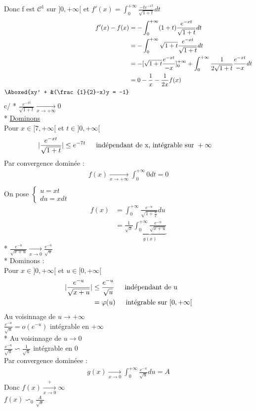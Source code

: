 \documentclass{article}
\begin{document}
Donc f est \(\mathcal{C}^{1}\) sur \(]0, +\infty[\) et \(f'(x) = \int_{0}^{+\infty}\frac{-te^{-x t}}{\sqrt{1+t}}dt\)
\begin{align*}
  f'(x)-f(x) &= -\int_{0}^{+\infty}(1+t)\frac{e^{-x t}}{\sqrt{1+t}}dt\\
             &= -\int_{0}^{+\infty}\sqrt{1+t}\frac{e^{-x t}}{\sqrt{1+t}}dt \\
             &= -[\sqrt{1+t}\frac{e^{-xt}}{-x}]^{+\infty}_{0} + \int_{0}^{+\infty}\frac{1}{2 \sqrt{1+t}}\frac{e^{-x t}}{-x}dt\\
             &= 0 - \frac{1}{x} - \frac{1}{2x}f(x)\\
  \Aboxed{xy' + &(\frac{1}{2}-x)y = -1}
\end{align*}
c/ * \(\frac{e^{-x t}}{\sqrt{1+t}}\xrightarrow[x \to +\infty]{} 0\)\\ 
* \underline{Dominons}\\ 
Pour \(x \in [7, +\infty[\) et \(t \in ]0, +\infty[\)\\ 
\begin{align*}
  |\frac{e^{-x t}}{\sqrt{1+t}}| &\leq e^{-7 t} \indent \text{indépendant de x, intégrable sur } +\infty
\end{align*}
Par convergence dominée : 
\begin{align*}
  f(x) \xrightarrow[x\to +\infty]{} \int_{0}^{+\infty}0 dt = 0 \\ 
\end{align*}
On pose 
\(\begin{cases}
    u = xt \\
    du =  x dt 
\end{cases}\)
\begin{align*}
  f(x) &= \int_{0}^{+\infty}\frac{e^{-u}}{\sqrt{1 + \frac{u}{x}}}du \\ 
       &= \frac{1}{\sqrt{x}}\underbrace{\int_{0}^{+\infty}\frac{e^{-u }}{\sqrt{x + u}}}_{g(x)}
\end{align*}
* \(\frac{e^{-u }}{\sqrt{x + u}} \xrightarrow[x \to 0]{} \frac{e^{-u }}{\sqrt{u }}\)\\ 
* Dominons : \\
Pour \(x \in ]0, +\infty[\) et \(u \in [0, +\infty[\)
\begin{align*}
  |\frac{e^{-u }}{\sqrt{x + u }}| &\leq \frac{e^{-u }}{\sqrt{u }} \indent \text{indépendant de u}\\ 
                                  &= \varphi(u) \indent \text{intégrable sur } [0, +\infty[
\end{align*}
Au voisinnage de \(u \rightarrow +\infty\)\\
\(\frac{e^{-u }}{\sqrt{u }} = o(e^{-u})\) intégrable en \(+\infty\)\\ 
* Au voisinnage de \(u \to 0\)\\
\(\frac{e^{-u }}{\sqrt{u }} \backsim \frac{1}{\sqrt{u }}\) intégrable en 0\\
Par convergence dominéee : 
\begin{align*}
  g(x) \xrightarrow[x \to 0]{}\int_{0}^{+\infty}\frac{e^{-u }}{\sqrt{u }}du = A 
\end{align*}
Donc \(f(x) \xrightarrow[x \to 0] +\infty\)\\ 
\(f(x) \backsim_{0} \frac{A}{\sqrt{x}}\)\\
\end{document}
